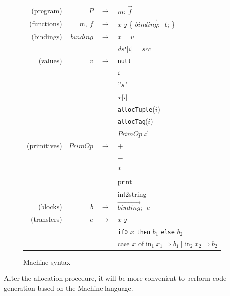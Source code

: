 \documentclass{article}
\theoremstyle{definition}
\theoremstyle{remark}
\numberwithin{equation}{section}
\begin{document}
\begin{figure}[!ht]
  \centering
\begin{tabular}{rrcl}
(program) & $P$ & $\to$ & $m$; $\vec{f}$ \\

(functions) & $m,\ f$ & $\to$ & $x$ $y$ \{
      $\overrightarrow{binding};$  $\ b$; \}\\

(bindings) & $binding$ & $\to$ & $x=v$ \\
        &     & $|$ & $dst\texttt{[}i\texttt{]}=src$\\

(values) & $v$ & $\to$ & \texttt{null} \\
        &     & $|$ & $i$\\
        &     & $|$ & $"s"$\\
        &     & $|$ & $x\texttt{[}i\texttt{]}$\\
        &     & $|$ & \texttt{allocTuple}($i$)\\
        &     & $|$ & \texttt{allocTag}($i$)\\
        &     & $|$ &  $PrimOp\ \vec{x}$\\

(primitives) & $PrimOp$ & $\to$ & $+$ \\
        &     & $|$ & $-$\\
        &     & $|$ & $*$\\
        &     & $|$ & \textsf{print}\\
        &     & $|$ & \textsf{int2string}\\

(blocks) & $b$ & $\to$ &  $\overrightarrow{binding};$  $\ e$\\

(transfers) & $e$ & $\to$ &  $x$ $y$\\
        &     & $|$ & \texttt{if0} $x$ \texttt{then} $b_1$ \texttt{else} $b_2$\\
        &     & $|$ & \textsf{case} $x$ \textsf{of in}$_1\ x_1 \Rightarrow b_1
                    \ |$ \textsf{in}$_2\ x_2 \Rightarrow b_2$\\
\end{tabular}
  \caption{Machine syntax}
  \label{fig-sub}
\end{figure}

After the allocation procedure, it will be more convenient to perform code
generation based on the Machine language.
\end{document}
